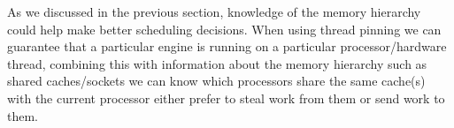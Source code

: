 

As we discussed in the previous section,
knowledge of the memory hierarchy could help make better scheduling
decisions.
When using thread pinning we can guarantee that a particular engine is
running on a particular processor/hardware thread,
combining this with information about the memory hierarchy such as shared
caches/sockets we can know which processors share the same cache(s) with the
current processor either prefer to steal work from them or send work to
them.

